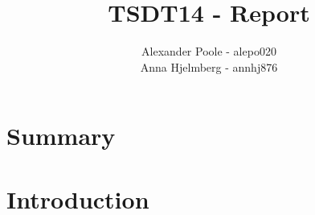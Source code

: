 \documentclass[a4paper,12pt]{article}
\title{TSDT14 - Report}
\author{Alexander Poole - alepo020 \\ Anna Hjelmberg - annhj876}
\begin{document}
\maketitle
	\thispagestyle{empty}
\newpage

\section{Summary}

\newpage
\tableofcontents
\newpage

\section{Introduction}







\end{document}
